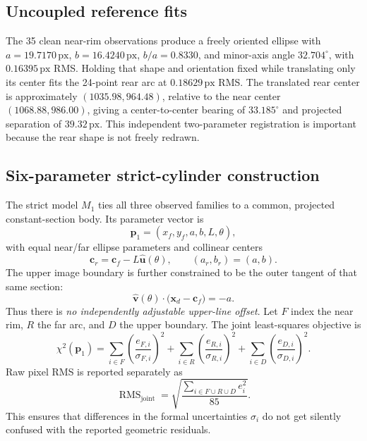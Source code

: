\documentclass[11pt,letterpaper]{article}
\newcommand{\rms}{\operatorname{RMS}}
\newcommand{\px}{\,\mathrm{px}}
\newcommand{\mat}[1]{\mathbf{#1}}
\begin{document}
\subsection{Uncoupled reference fits}

The 35 clean near-rim observations produce a freely oriented ellipse with \(a=19.7170\px\), \(b=16.4240\px\), \(b/a=0.8330\), and minor-axis angle \(32.704^\circ\), with \(0.16395\px\) RMS. Holding that shape and orientation fixed while translating only its center fits the 24-point rear arc at \(0.18629\px\) RMS. The translated rear center is approximately \((1035.98,964.48)\), relative to the near center \((1068.88,986.00)\), giving a center-to-center bearing of \(33.185^\circ\) and projected separation of \(39.32\px\). This independent two-parameter registration is important because the rear shape is not freely redrawn.

\subsection{Six-parameter strict-cylinder construction}
\label{sec:strict}

The strict model \(M_1\) ties all three observed families to a common, projected constant-section body. Its parameter vector is
\begin{equation}
 \mat p_1=(x_f,y_f,a,b,L,\theta),
\end{equation}
with equal near/far ellipse parameters and collinear centers
\begin{equation}
 \mat c_r=\mat c_f-L\hat{\mat u}(\theta),\qquad
 (a_r,b_r)=(a,b).
 \label{eq:axis}
\end{equation}
The upper image boundary is further constrained to be the outer tangent of that same section:
\begin{equation}
 \hat{\mat v}(\theta)\cdot\bigl(\mat x_d-\mat c_f\bigr)=-a.
 \label{eq:tangent}
\end{equation}
Thus there is \emph{no independently adjustable upper-line offset}. Let \(F\) index the near rim, \(R\) the far arc, and \(D\) the upper boundary. The joint least-squares objective is
\begin{equation}
 \chi^2(\mat p_1)=\sum_{i\in F}\left(\frac{e_{F,i}}{\sigma_{F,i}}\right)^2
 +\sum_{i\in R}\left(\frac{e_{R,i}}{\sigma_{R,i}}\right)^2
 +\sum_{i\in D}\left(\frac{e_{D,i}}{\sigma_{D,i}}\right)^2.
 \label{eq:loss}
\end{equation}
Raw pixel RMS is reported separately as
\begin{equation}
 \rms_{\mathrm{joint}}=\sqrt{\frac{\sum_{i\in F\cup R\cup D}e_i^2}{85}}.
 \label{eq:rms}
\end{equation}
This ensures that differences in the formal uncertainties \(\sigma_i\) do not get silently confused with the reported geometric residuals.
\end{document}
